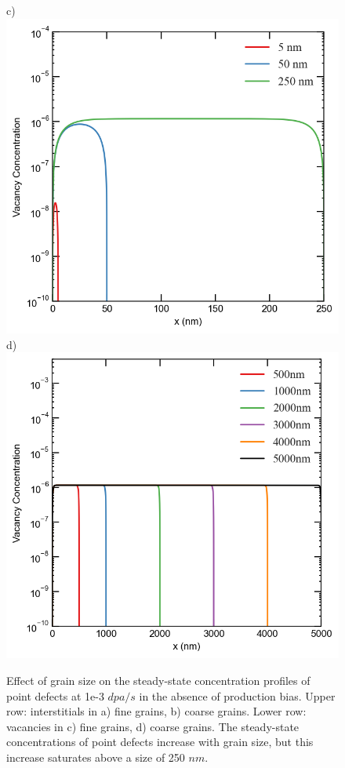 \documentclass[utf8]{frontiersSCNS} %
\begin{document}
\begin{figure}[h!]
        c)\includegraphics[scale=0.55]{Fig4_c}
        d)\includegraphics[scale=0.55]{Fig4_d}
        \caption{Effect of grain size on the steady-state concentration profiles of point defects at 1e-3 $dpa/s$ in the absence of production bias. Upper row: interstitials in a) fine grains, b) coarse grains. Lower row: vacancies in c) fine grains, d) coarse grains. The steady-state concentrations of point defects increase with grain size, but this increase saturates above a size of 250 $nm$. }
        \label{figure:concentrations_micro_nano_neutron_5_1e-3}
    \end{figure}
    
\end{document}
